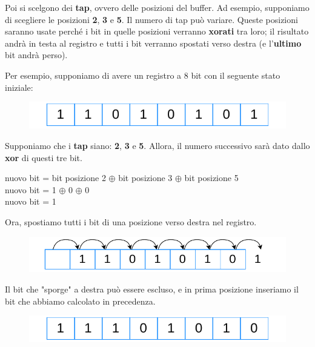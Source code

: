 \documentclass{report}
\begin{document}
Poi si scelgono dei \textbf{tap}, ovvero delle posizioni del buffer.  
Ad esempio, supponiamo di scegliere le posizioni \textbf{2}, \textbf{3} e \textbf{5}. Il numero di tap può variare.  
Queste posizioni saranno usate perché i bit in quelle posizioni verranno \textbf{xorati} tra loro; il risultato andrà in testa al registro e tutti i bit verranno spostati verso destra (e l'\textbf{ultimo} bit andrà perso).


Per esempio, supponiamo di avere un registro a 8 bit con il seguente stato iniziale:


\begin{figure}[h]
    \centering
    \includegraphics[width=0.7\linewidth]{logos/4_4cripto.pdf}
\end{figure}

Supponiamo che i \textbf{tap} siano: \textbf{2}, \textbf{3} e \textbf{5}.  
Allora, il numero successivo sarà dato dallo \textbf{xor} di questi tre bit.


\begin{center}
    nuovo bit = bit posizione 2 $\oplus$ bit posizione 3 $\oplus$ bit posizione 5 \\
    nuovo bit = 1 $\oplus$ 0 $\oplus$ 0 \\
    nuovo bit = 1
\end{center}

Ora, spostiamo tutti i bit di una posizione verso destra nel registro.


\begin{figure}[!h]
    \centering
    \includegraphics[width=0.7\linewidth]{logos/4_5cripto.pdf}
\end{figure}

Il bit che "sporge" a destra può essere escluso, e in prima posizione inseriamo il bit che abbiamo calcolato in precedenza.


\begin{figure}[!h]
    \centering
    \includegraphics[width=0.7\linewidth]{logos/4_6cripto.pdf}
\end{figure}
\end{document}
